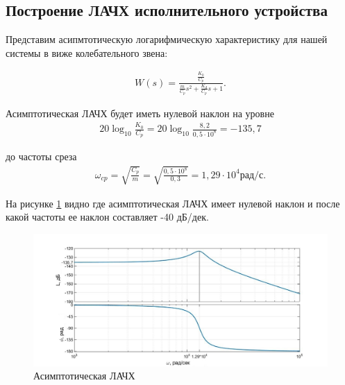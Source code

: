 \documentclass[a4paper, 12pt]{article}
\begin{document}
\begin{center}
	\section{Построение ЛАЧХ исполнительного устройства}
\end{center}\par

Представим асипмтотическую логарифмическую характеристику для нашей системы в виже колебательного звена:

\begin{align}
	W(s) = \frac{\displaystyle{\frac{K_0}{C_p}}}{\displaystyle{\frac{m}{C_p}}s^2 + \frac{K_d}{C_p}s + 1}.
\end{align}\par
Асимптотическая ЛАЧХ будет иметь нулевой наклон на уровне
\begin{align}
	20\log_{10} \frac{K_0}{C_p} = 20\log_{10} \frac{8,2}{0,5\cdot10^8} = -135,7
\end{align}\par
до частоты среза 
\begin{align}
	\omega_{cp} = \sqrt{\frac{C_p}{m}} = \sqrt{\frac{0,5\cdot10^8}{0,3}} = 1,29\cdot10^4 \text{рад/с}.
\end{align}

На рисунке \ref{lachx} видно где асимптотическая ЛАЧХ имеет нулевой наклон и после какой частоты ее наклон составляет -40 дБ/дек.

\begin{figure}[h!]
	\centering
	\includegraphics[width = 0.65\textheight]{data/lachx}
	\caption{Асимптотическая ЛАЧХ}
	\label{lachx}
\end{figure}

\newpage
\end{document}

